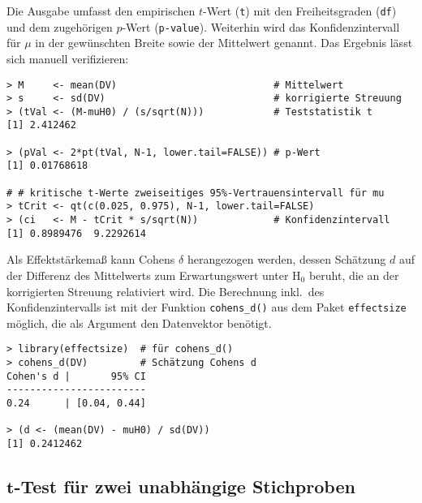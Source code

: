 Die Ausgabe umfasst den empirischen $t$-Wert (\lstinline!t!) mit den Freiheitsgraden (\lstinline!df!) und dem zugehörigen $p$-Wert (\lstinline!p-value!). Weiterhin wird das Konfidenzintervall für $\mu$ in der gewünschten Breite sowie der Mittelwert genannt. Das Ergebnis lässt sich manuell verifizieren:
\begin{lstlisting}
> M     <- mean(DV)                           # Mittelwert
> s     <- sd(DV)                             # korrigierte Streuung
> (tVal <- (M-muH0) / (s/sqrt(N)))            # Teststatistik t
[1] 2.412462

> (pVal <- 2*pt(tVal, N-1, lower.tail=FALSE)) # p-Wert
[1] 0.01768618

# # kritische t-Werte zweiseitiges 95%-Vertrauensintervall für mu
> tCrit <- qt(c(0.025, 0.975), N-1, lower.tail=FALSE)
> (ci   <- M - tCrit * s/sqrt(N))             # Konfidenzintervall
[1] 0.8989476  9.2292614
\end{lstlisting}

Als Effektstärkemaß kann Cohens $\delta$ herangezogen werden, dessen Schätzung $d$ auf der Differenz des Mittelwerts zum Erwartungswert unter $\text{H}_{0}$ beruht, die an der korrigierten Streuung relativiert wird. Die Berechnung inkl.\ des Konfidenzintervalls ist mit der Funktion \lstinline!cohens_d()! aus dem Paket \lstinline!effectsize! \cite{Ludecke2020} möglich, die als Argument den Datenvektor benötigt.
\begin{lstlisting}
> library(effectsize)  # für cohens_d()
> cohens_d(DV)         # Schätzung Cohens d
Cohen's d |       95% CI
------------------------
0.24      | [0.04, 0.44]

> (d <- (mean(DV) - muH0) / sd(DV))
[1] 0.2412462
\end{lstlisting}

\subsection[\texorpdfstring{$t$}{t}-Test für zwei unabhängige Stichproben]{$\bm{t}$-Test für zwei unabhängige Stichproben}
\label{sec:tTwoInd}

